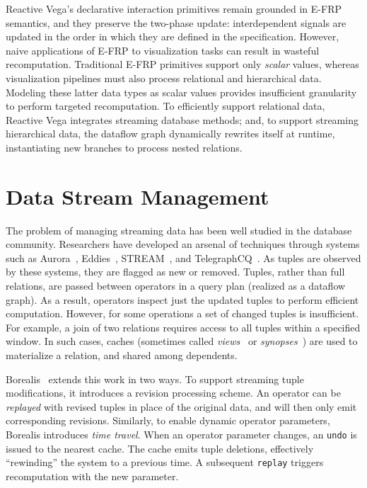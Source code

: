 Reactive Vega's declarative interaction primitives remain grounded in E-FRP
semantics, and they preserve the two-phase update: interdependent signals are
updated in the order in which they are defined in the specification. However,
naive applications of E-FRP to visualization tasks can result in wasteful
recomputation. Traditional E-FRP primitives support only \emph{scalar} values,
whereas visualization pipelines must also process relational and hierarchical
data. Modeling these latter data types as scalar values provides insufficient
granularity to perform targeted recomputation. To efficiently support relational
data, Reactive Vega integrates streaming database methods; and, to support
streaming hierarchical data, the dataflow graph dynamically rewrites itself at
runtime, instantiating new branches to process nested relations.

\vspace{-25pt}

\section{Data Stream Management}

\vspace{-10pt}

The problem of managing streaming data has been well studied in the database
community. Researchers have developed an arsenal of techniques through systems
such as Aurora~\cite{abadi:aurora}, Eddies~\cite{avnur:eddies},
STREAM~\cite{arasu:stream}, and TelegraphCQ~\cite{chandrasekaran:telegraphcq}.
As tuples are observed by these systems, they are flagged as new or removed.
Tuples, rather than full relations, are passed between operators in a query plan
(realized as a dataflow graph). As a result, operators inspect just the updated
tuples to perform efficient computation. However, for some operations a set of
changed tuples is insufficient. For example, a join of two relations requires
access to all tuples within a specified window. In such cases, caches (sometimes
called \emph{views}~\cite{abadi:aurora} or \emph{synopses}~\cite{arasu:stream})
are used to materialize a relation, and shared among dependents.

Borealis~\cite{abadi:borealis} extends this work in two ways. To support
streaming tuple modifications, it introduces a revision processing scheme. An
operator can be \emph{replayed} with revised tuples in place of the original
data, and will then only emit corresponding revisions. Similarly, to enable
dynamic operator parameters, Borealis introduces \emph{time travel}. When an
operator parameter changes, an \texttt{undo} is issued to the nearest cache. The
cache emits tuple deletions, effectively ``rewinding'' the system to a previous
time. A subsequent \texttt{replay} triggers recomputation with the new
parameter.

